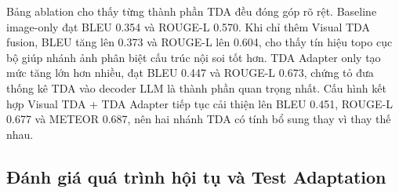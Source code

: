 \documentclass[11pt,a4paper]{article}
\begin{document}
\begin{table}[h]
\centering
\caption{Ablation module TDA trên full-test.}
\small
{}
\end{table}

Bảng ablation cho thấy từng thành phần TDA đều đóng góp rõ rệt. Baseline image-only đạt BLEU 0.354 và ROUGE-L 0.570. Khi chỉ thêm Visual TDA fusion, BLEU tăng lên 0.373 và ROUGE-L lên 0.604, cho thấy tín hiệu topo cục bộ giúp nhánh ảnh phân biệt cấu trúc nội soi tốt hơn. TDA Adapter only tạo mức tăng lớn hơn nhiều, đạt BLEU 0.447 và ROUGE-L 0.673, chứng tỏ đưa thống kê TDA vào decoder LLM là thành phần quan trọng nhất. Cấu hình kết hợp Visual TDA + TDA Adapter tiếp tục cải thiện lên BLEU 0.451, ROUGE-L 0.677 và METEOR 0.687, nên hai nhánh TDA có tính bổ sung thay vì thay thế nhau.

\subsection{Đánh giá quá trình hội tụ và Test Adaptation}
\end{document}

